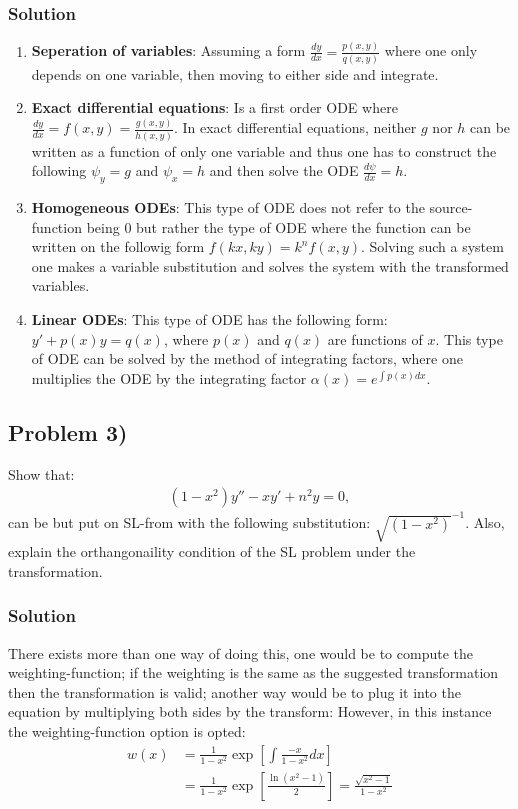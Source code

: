 \subsubsection*{Solution}
\begin{enumerate}
    \item \textbf{Seperation of variables}: Assuming a form $\frac{dy}{dx} = \frac{p(x,y)}{q(x,y)}$ where one only depends on one variable, then moving to either side and integrate.  
    \item \textbf{Exact differential equations}: Is a first order ODE where $\frac{dy}{dx} = f(x,y) = \frac{g(x,y)}{h(x,y)}$. In exact differential equations, neither $g$ nor $h$ can be written as a function of only one variable and thus one has to construct the following $\psi_y = g$ and $\psi_x = h$ and then solve the ODE $\frac{d\psi}{dx} = h$.
    \item \textbf{Homogeneous ODEs}: This type of ODE does not refer to the source-function being $0$ but rather the type of ODE where the function can be written on the followig form $f(kx,ky)=k^nf(x,y)$. Solving such a system one makes a variable substitution and solves the system with the transformed variables.
    \item \textbf{Linear ODEs}: This type of ODE has the following form: $y' + p(x)y = q(x)$, where $p(x)$ and $q(x)$ are functions of $x$. This type of ODE can be solved by the method of integrating factors, where one multiplies the ODE by the integrating factor $\alpha(x) = e^{\int p(x)dx}$.
\end{enumerate}

\subsection*{Problem 3)}
Show that:
\begin{align*}
    (1-x^2)y'' -xy' +n^2y = 0,
\end{align*}can be but put on SL-from with the following substitution: $\sqrt{(1-x^2)}^{-1}$. Also, explain the orthangonaility condition of the SL problem under the transformation.

\subsubsection*{Solution}
There exists more than one way of doing this, one would be to compute the weighting-function; if the weighting is the same as the suggested transformation then the transformation is valid; another way would be to plug it into the equation by multiplying both sides by the transform:
However, in this instance the weighting-function option is opted:
\begin{align*}
    w(x) &= \frac{1}{1-x^2}\exp\left[\int \frac{-x}{1-x^2}dx\right]\\
    &= \frac{1}{1-x^2}\exp\left[\frac{\ln(x^2 -1)}{2}\right] = \frac{\sqrt{x^2 -1}}{1-x^2}\\
\end{align*}

